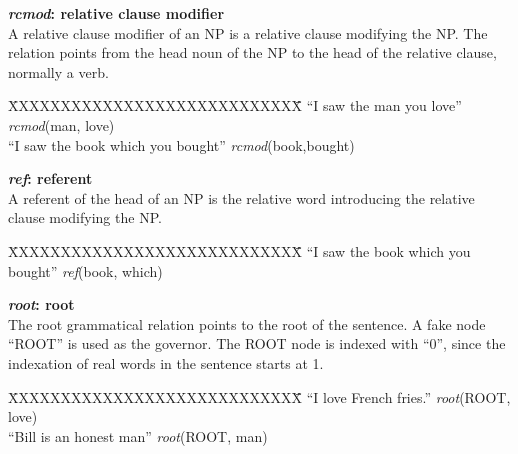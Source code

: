 \documentclass[11pt,letterpaper]{article}
\begin{document}
\noindent\textbf{\emph{rcmod}: relative clause modifier}\\
A relative clause modifier of an NP is a relative clause modifying the NP.  The relation points from the head noun of the NP to the head of the relative clause, normally a verb.
\begin{tabbing}
\hspace{1cm} \=XXXXXXXXXXXXXXXXXXXXXXXXXXXX\= \hspace{1cm}\=  \kill
\>  ``I saw the man you love'' \> \> \emph{rcmod}(man, love)\\
\> ``I saw the book which you bought'' \> \> \emph{rcmod}(book,bought)\\
\end{tabbing}

\noindent\textbf{\emph{ref}: referent}\\
A referent of the head of an NP is the relative word introducing the relative clause modifying the NP.
\begin{tabbing}
\hspace{1cm} \=XXXXXXXXXXXXXXXXXXXXXXXXXXXX\= \hspace{1cm}\=  \kill
\>  ``I saw the book which you bought'' \> \> \emph{ref}(book, which)\\
\end{tabbing}


\noindent\textbf{\emph{root}: root}\\
The root grammatical relation points to the root of the sentence. A fake node ``ROOT'' is used as the governor. The ROOT node is indexed with ``0'', since the indexation of real words in the sentence starts at 1.
\begin{tabbing}
\hspace{1cm} \=XXXXXXXXXXXXXXXXXXXXXXXXXXXX\= \hspace{1cm}\=  \kill
\> ``I love French fries.'' \> \> \emph{root}(ROOT, love)\\
\> ``Bill is an honest man'' \>  \> \emph{root}(ROOT, man)\\
\end{tabbing}
\end{document}
